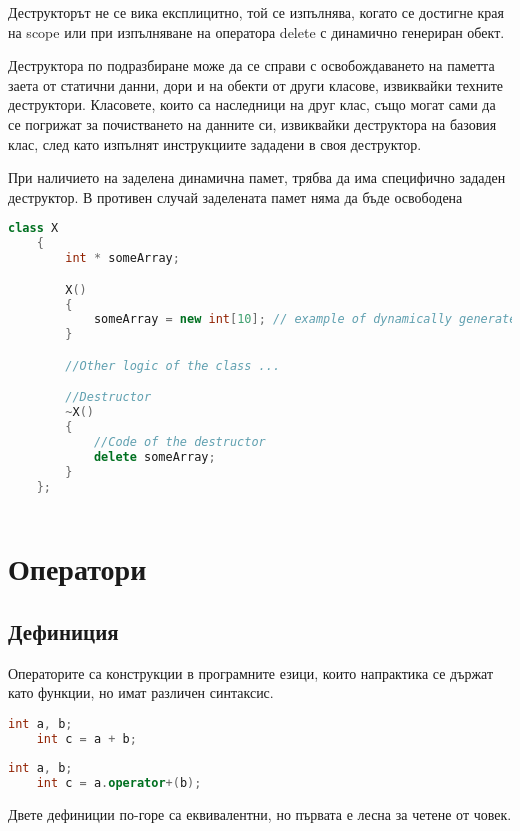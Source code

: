 \documentclass[fleqn,12pt]{article}
\begin{document}
Деструкторът не се вика експлицитно, той се изпълнява, когато се достигне края на scope или при изпълняване на оператора delete с динамично генериран обект. 

Деструктора по подразбиране може да се справи с освобождаването на паметта заета от статични данни, дори и на обекти от други класове, извиквайки техните деструктори. Класовете, които са наследници на друг клас, също могат сами да се погрижат за почистването на данните си, извиквайки деструктора на базовия клас, след като изпълнят инструкциите зададени в своя деструктор.

При наличието на заделена динамична памет, трябва да има специфично зададен деструктор. В противен случай заделената памет няма да бъде освободена

\begin{lstlisting}[language=C++, caption=Example custom destructor]
    class X
    {
        int * someArray;

        X() 
        {
            someArray = new int[10]; // example of dynamically generated memory
        }

        //Other logic of the class ...

        //Destructor
        ~X()
        {
            //Code of the destructor
            delete someArray;
        }
    };
    
\end{lstlisting}


\section{Оператори}
\subsection{Дефиниция}
Операторите са конструкции в програмните езици, които напрактика се държат като функции, но имат различен синтаксис. 

\begin{lstlisting}[language=C++, caption=Example use of operators]
    int a, b;
    int c = a + b;
\end{lstlisting}

\begin{lstlisting}[language=C++, caption=Equivalent use of operators]
    int a, b;
    int c = a.operator+(b);
\end{lstlisting}

Двете дефиниции по-горе са еквивалентни, но първата е лесна за четене от човек.
\end{document}

